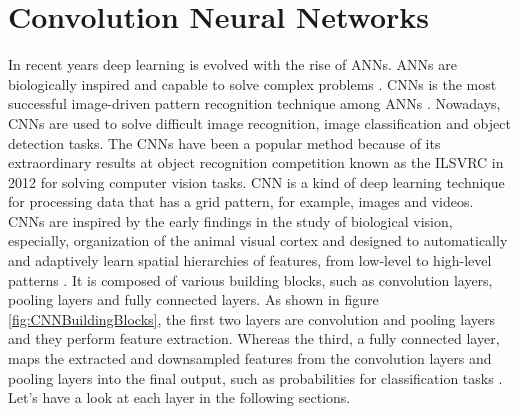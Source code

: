 \newpage
\section{Convolution Neural Networks}\label{CNNs}

In recent years deep learning is evolved with the rise of \acp{ANN}. \acp{ANN} are biologically inspired and capable to solve complex problems \cite{oshea2015introduction}. \acp{CNN} is the most successful image-driven pattern recognition technique among \acp{ANN} \cite{oshea2015introduction}. Nowadays, \acp{CNN} are used to solve difficult image recognition, image classification and object detection tasks. The \acp{CNN} have been a popular method because of its extraordinary results at object recognition competition known as the \ac{ILSVRC} in 2012 for solving computer vision tasks. \ac{CNN} is a kind of deep learning technique for processing data that has a grid pattern, for example, images and videos. \acp{CNN} are inspired by the early findings in the study of biological vision, especially, organization of the animal visual cortex \cite{Hubel.1968} \cite{Fukushima.1980} \cite{10.5555/3153997} and designed to automatically and adaptively learn spatial hierarchies of features, from low-level to high-level patterns \cite{10.5555/3153997}. It is composed of various building blocks, such as convolution layers, pooling layers and fully connected layers. As shown in figure \ref{fig:CNNBuildingBlocks}, the first two layers are convolution and pooling layers and they perform feature extraction. Whereas the third, a fully connected layer, maps the extracted and downsampled features from the convolution layers and pooling layers into the final output, such as probabilities for classification tasks \cite{articleCNNs}. Let's have a look at each layer in the following sections.



